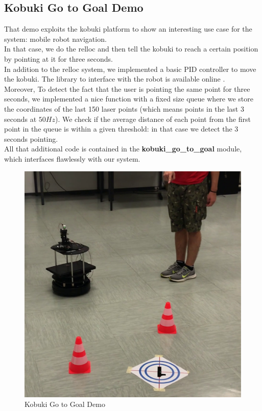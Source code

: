 \subsection{Kobuki Go to Goal Demo}\label{subs:kobukiGoToGoal}
That demo exploits the kobuki platform to show an interesting use case for the system: mobile robot navigation.\\
In that case, we do the relloc and then tell the kobuki to reach a certain position by pointing at it for three seconds.\\
In addition to the relloc system, we implemented a basic PID controller to move the kobuki. The library to interface with the robot is available online \cite{kobuki:ROS}.\\ Moreover, To detect the fact that the user is pointing the same point for three seconds, we implemented a nice function with a fixed size queue where we store the coordinates of the last 150 laser points (which means points in the last $3$ seconds at $50Hz$). We check if the average distance of each point from the first point in the queue is within a given threshold: in that case we detect the 3 seconds pointing.\\
All that additional code is contained in the \textbf{kobuki\_go\_to\_goal} module, which interfaces flawlessly with our system.
\begin{figure}
	\centering
	\includegraphics[width=\textwidth]{img/goToGoalDemo.png}%
	\caption{Kobuki Go to Goal Demo}
	\label{fig:goToGoalDemo}
\end{figure}
